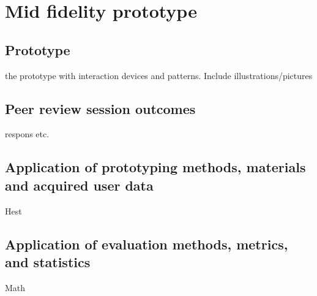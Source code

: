 \chapter{Mid fidelity prototype}

\section{Prototype}
the prototype with interaction devices and patterns. Include illustrations/pictures

\section{Peer review session outcomes}
respons etc.

\section{Application of prototyping methods, materials and acquired user data}
Hest

\section{Application of evaluation methods, metrics, and statistics}
Math